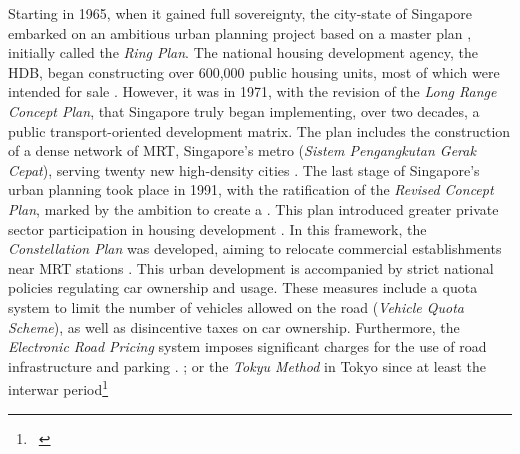 \begin{refsegment}
{    Starting in 1965, when it gained full sovereignty, the city-state of Singapore embarked on an ambitious urban planning project based on a master plan \textcolor{blue}{\autocite[p.~155-179 (Chapter~6)]{cervero_transit_1998}}, initially called the \textsl{Ring Plan}. The national housing development agency, the \acrfull{HDB}, began constructing over 600,000 public housing units, most of which were intended for sale \textcolor{blue}{\autocite[167]{guillot_singapour_2007}}. However, it was in 1971, with the revision of the \textsl{Long Range Concept Plan}, that Singapore truly began implementing, over two decades, a public transport-oriented development matrix. The plan includes the construction of a dense network of \acrfull{MRT}, Singapore's metro (\textsl{Sistem Pengangkutan Gerak Cepat}), serving twenty new high-density cities \textcolor{blue}{\autocite[162]{cervero_transit_1998}}. The last stage of Singapore's urban planning took place in 1991, with the ratification of the \textsl{Revised Concept Plan}, marked by the ambition to create a . This plan introduced greater private sector participation in housing development \textcolor{blue}{\autocite[168]{guillot_singapour_2007}}. In this framework, the \textsl{Constellation Plan} was developed, aiming to relocate commercial establishments near \acrshort{MRT} stations \textcolor{blue}{\autocite[362]{richmond_transporting_2008}}. This urban development is accompanied by strict national policies regulating car ownership and usage. These measures include a quota system to limit the number of vehicles allowed on the road (\textsl{Vehicle Quota Scheme}), as well as disincentive taxes on car ownership. Furthermore, the \textsl{Electronic Road Pricing} system imposes significant charges for the use of road infrastructure and parking \textcolor{blue}{\autocite[162]{joshi_transit-oriented_2017}}.
}; or the \textsl{Tokyu Method} in Tokyo since at least the interwar period\footnote{~
}
\end{refsegment}
